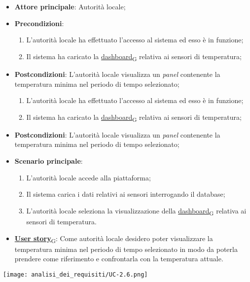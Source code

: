 \begin{itemize}
	\item \textbf{Attore principale}: Autorità locale;
	\item \textbf{Precondizioni}:
	      \begin{enumerate}
		      \item L'autorità locale ha effettuato l'accesso al sistema ed esso è in funzione;
		      \item Il sistema ha caricato la \href{https://7last.github.io/docs/rtb/documentazione-interna/glossario\#dashboard}{dashboard\textsubscript{G}} relativa ai sensori di temperatura;
	      \end{enumerate}
	\item \textbf{Postcondizioni}: L'autorità locale visualizza un \textit{panel} contenente la temperatura minima nel periodo di tempo selezionato;
	      \begin{enumerate}
		      \item L'autorità locale ha effettuato l'accesso al sistema ed esso è in funzione;
		      \item Il sistema ha caricato la \href{https://7last.github.io/docs/rtb/documentazione-interna/glossario\#dashboard}{dashboard\textsubscript{G}} relativa ai sensori di temperatura;
	      \end{enumerate}
	\item \textbf{Postcondizioni}: L'autorità locale visualizza un \textit{panel} contenente la temperatura minima nel periodo di tempo selezionato;
	\item \textbf{Scenario principale}:
	      \begin{enumerate}
		      \item L'autorità locale accede alla piattaforma;
		      \item Il sistema carica i dati relativi ai sensori interrogando il database;
		      \item L'autorità locale seleziona la visualizzazione della \href{https://7last.github.io/docs/rtb/documentazione-interna/glossario\#dashboard}{dashboard\textsubscript{G}} relativa ai sensori di temperatura.
	      \end{enumerate}
	\item \href{https://7last.github.io/docs/rtb/documentazione-interna/glossario\#user-story}{\textbf{User story}\textsubscript{G}}:
	      Come autorità locale desidero poter visualizzare la temperatura minima nel periodo di tempo selezionato
	      in modo da poterla prendere come riferimento e confrontarla con la temperatura attuale.
\end{itemize}
\begin{center}
	\texttt{[image: analisi\_dei\_requisiti/UC-2.6.png]}
\end{center}

